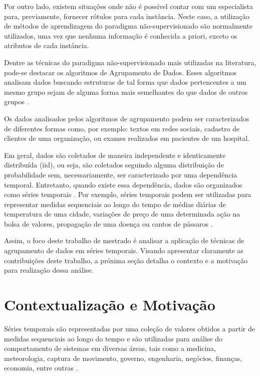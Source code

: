 Por outro lado, existem situações onde não é possível contar com um especialista para, previamente, fornecer rótulos para cada instância. Neste caso, a utilização de métodos de aprendizagem do paradigma não-supervisionado são normalmente utilizados, uma vez que nenhuma informação é conhecida a priori, exceto os atributos de cada instância.

Dentre as técnicas do paradigma não-supervisionado mais utilizadas na literatura, pode-se destacar os algoritmos de Agrupamento de Dados. Esses algoritmos analisam dados buscando estruturas de tal forma que dados pertencentes a um mesmo grupo sejam de alguma forma mais semelhantes do que dados de outros grupos \cite{Mitchell:1997:ML:541177,faceli2011inteligencia, Aghabozorgi2015}.

Os dados analisados pelos algoritmos de agrupamento podem  ser caracterizados de diferentes formas como, por exemplo:  textos em redes sociais, cadastro de clientes de uma organização, ou exames realizados em pacientes de um hospital. 

Em geral, dados são coletados de maneira independente e identicamente distribuída (iid), ou seja, são coletados seguindo alguma distribuição de probabilidade sem, necessariamente, ser caracterizado por uma dependência temporal. Entretanto, quando existe essa dependência, dados são organizados como séries temporais \cite{Esling2012,box2015}. Por exemplo, séries temporais podem ser utilizadas para representar medidas sequenciais ao longo do tempo de médias diárias de temperatura de uma cidade, variações de preço de uma determinada ação na bolsa de valores, propagação de uma doença ou cantos de pássaros \cite{Esling2012}. 

Assim, o foco deste trabalho de mestrado é analisar a aplicação de técnicas de agrupamento de dados em séries temporais. Visando apresentar claramente as contribuições deste trabalho, a próxima seção detalha o contexto e a motivação para realização dessa análise.

\section{Contextualização e Motivação}

Séries temporais são representadas por uma coleção de valores obtidos a partir de medidas sequenciais ao longo do tempo e são utilizadas para análise do comportamento de sistemas em diversas áreas, tais como a medicina, meteorologia, captura de movimento, governo, engenharia, negócios, finanças, economia, entre outras \cite{Esling2012,box2015}. 

